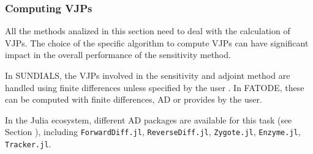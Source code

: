 \subsubsection{Computing VJPs}

All the methods analized in this section need to deal with the calculation of VJPs.  
The choice of the specific algorithm to compute VJPs can have significant impact in the overall performance of the sensitivity method. 

In SUNDIALS, the VJPs involved in the sensitivity and adjoint method are handled using finite differences unless specified by the user \cite{SUNDIALS-hindmarsh2005sundials}.
In FATODE, these can be computed with finite differences, AD or provides by the user.

In the Julia ecosystem, different AD packages are available for this task (see Section ), including \texttt{ForwardDiff.jl}, \texttt{ReverseDiff.jl}, \texttt{Zygote.jl}\cite{Innes_Zygote}, \texttt{Enzyme.jl}\cite{moses_Enzyme}, \texttt{Tracker.jl}.
